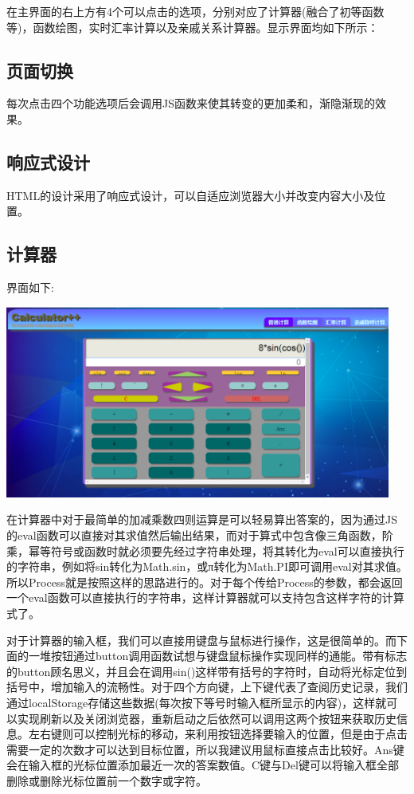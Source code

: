 \documentclass[hyperref,UTF8]{ctexart}
\begin{document}
在主界面的右上方有4个可以点击的选项，分别对应了计算器(融合了初等函数等)，函数绘图，实时汇率计算以及亲戚关系计算器。显示界面均如下所示：

\subsection{页面切换}
每次点击四个功能选项后会调用JS函数来使其转变的更加柔和，渐隐渐现的效果。

\subsection{响应式设计}

HTML的设计采用了响应式设计，可以自适应浏览器大小并改变内容大小及位置。

\subsection{计算器}
界面如下:

\begin{center}
\includegraphics[width=5in]{cal.PNG}
\end{center}


在计算器中对于最简单的加减乘数四则运算是可以轻易算出答案的，因为通过JS的eval函数可以直接对其求值然后输出结果，而对于算式中包含像三角函数，阶乘，幂等符号或函数时就必须要先经过字符串处理，将其转化为eval可以直接执行的字符串，例如将sin转化为Math.sin，或π转化为Math.PI即可调用eval对其求值。所以Process就是按照这样的思路进行的。对于每个传给Process的参数，都会返回一个eval函数可以直接执行的字符串，这样计算器就可以支持包含这样字符的计算式了。

对于计算器的输入框，我们可以直接用键盘与鼠标进行操作，这是很简单的。而下面的一堆按钮通过button调用函数试想与键盘鼠标操作实现同样的通能。带有标志的button顾名思义，并且会在调用sin()这样带有括号的字符时，自动将光标定位到括号中，增加输入的流畅性。对于四个方向键，上下键代表了查阅历史记录，我们通过localStorage存储这些数据(每次按下等号时输入框所显示的内容)，这样就可以实现刷新以及关闭浏览器，重新启动之后依然可以调用这两个按钮来获取历史信息。左右键则可以控制光标的移动，来利用按钮选择要输入的位置，但是由于点击需要一定的次数才可以达到目标位置，所以我建议用鼠标直接点击比较好。Ans键会在输入框的光标位置添加最近一次的答案数值。C键与Del键可以将输入框全部删除或删除光标位置前一个数字或字符。
\end{document}
